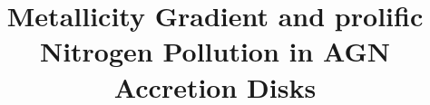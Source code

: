 \documentclass[linenumbers,trackchanges]{aastex701}
\begin{document}
\title{Metallicity Gradient and prolific Nitrogen 
Pollution in AGN Accretion Disks}

\end{document}
